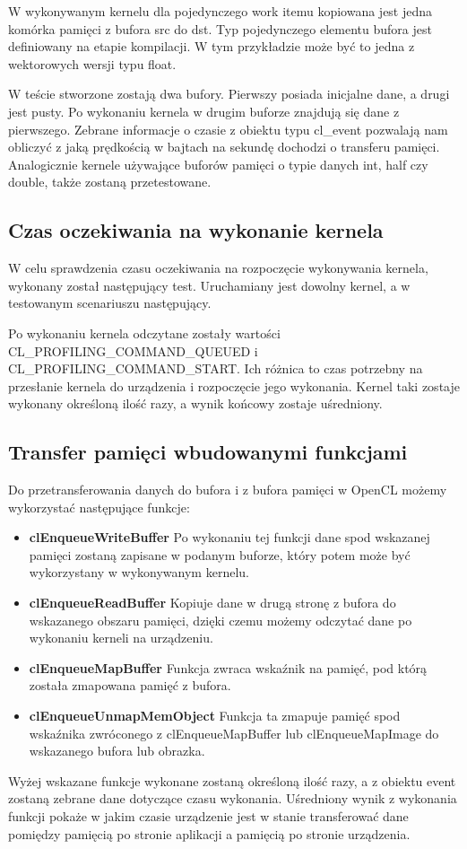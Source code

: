 
 
W wykonywanym kernelu dla pojedynczego work itemu kopiowana jest jedna komórka pamięci z bufora src do dst. Typ pojedynczego elementu bufora jest definiowany na etapie kompilacji. W tym przykładzie może być to jedna z wektorowych wersji typu float.

W teście stworzone zostają dwa bufory. Pierwszy posiada inicjalne dane, a drugi jest pusty. Po wykonaniu kernela w drugim buforze znajdują się dane z pierwszego. Zebrane informacje o czasie z obiektu typu cl\_event pozwalają nam obliczyć z jaką prędkością w bajtach na sekundę dochodzi o transferu pamięci.
Analogicznie kernele używające buforów pamięci o typie danych int, half czy double, także zostaną przetestowane.

\subsection[Czas oczekiwania na wykonanie kernela]{Czas oczekiwania na wykonanie kernela}
W celu sprawdzenia czasu oczekiwania na rozpoczęcie wykonywania kernela, wykonany został następujący test. Uruchamiany jest dowolny kernel, a w testowanym scenariuszu następujący.



Po wykonaniu kernela odczytane zostały wartości CL\_PROFILING\_COMMAND\_QUEUED i CL\_PROFILING\_COMMAND\_START. Ich różnica to czas potrzebny na przesłanie kernela do urządzenia i rozpoczęcie jego wykonania. Kernel taki zostaje wykonany określoną ilość razy, a wynik końcowy zostaje uśredniony.
\subsection[Transfer pamięci wbudowanymi funkcjami]{Transfer pamięci wbudowanymi funkcjami}
Do przetransferowania danych do bufora i z bufora pamięci w OpenCL możemy wykorzystać następujące funkcje:
 \begin{itemize}
	\item \textbf{clEnqueueWriteBuffer} Po wykonaniu tej funkcji dane spod wskazanej pamięci zostaną zapisane w podanym buforze, który potem może być wykorzystany w wykonywanym kernelu.
	\item \textbf{clEnqueueReadBuffer} Kopiuje dane w drugą stronę z bufora do wskazanego obszaru pamięci, dzięki czemu możemy odczytać dane po wykonaniu kerneli na urządzeniu.
	\item \textbf{clEnqueueMapBuffer} Funkcja zwraca wskaźnik na pamięć, pod którą została zmapowana pamięć z bufora.
	\item \textbf{clEnqueueUnmapMemObject} Funkcja ta zmapuje pamięć spod wskaźnika zwróconego z clEnqueueMapBuffer lub clEnqueueMapImage do wskazanego bufora lub obrazka.
\end{itemize}
Wyżej wskazane funkcje wykonane zostaną określoną ilość razy, a z obiektu event zostaną zebrane dane dotyczące czasu wykonania. Uśredniony wynik z wykonania funkcji pokaże w jakim czasie urządzenie jest w stanie transferować dane pomiędzy pamięcią po stronie aplikacji a pamięcią po stronie urządzenia.

